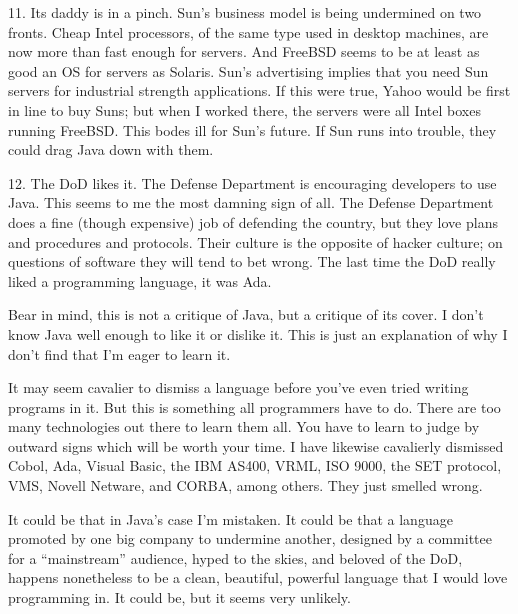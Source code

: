 11. Its daddy is in a pinch. Sun's business model is being undermined on
two fronts. Cheap Intel processors, of the same type used in desktop
machines, are now more than fast enough for servers. And FreeBSD seems
to be at least as good an OS for servers as Solaris. Sun's advertising
implies that you need Sun servers for industrial strength applications.
If this were true, Yahoo would be first in line to buy Suns; but when I
worked there, the servers were all Intel boxes running FreeBSD. This
bodes ill for Sun's future. If Sun runs into trouble, they could drag
Java down with them.

12. The DoD likes it. The Defense Department is encouraging developers
to use Java. This seems to me the most damning sign of all. The Defense
Department does a fine (though expensive) job of defending the country,
but they love plans and procedures and protocols. Their culture is the
opposite of hacker culture; on questions of software they will tend to
bet wrong. The last time the DoD really liked a programming language, it
was Ada.

Bear in mind, this is not a critique of Java, but a critique of its
cover. I don't know Java well enough to like it or dislike it. This is
just an explanation of why I don't find that I'm eager to learn it.

It may seem cavalier to dismiss a language before you've even tried
writing programs in it. But this is something all programmers have to
do. There are too many technologies out there to learn them all. You
have to learn to judge by outward signs which will be worth your time. I
have likewise cavalierly dismissed Cobol, Ada, Visual Basic, the IBM
AS400, VRML, ISO 9000, the SET protocol, VMS, Novell Netware, and CORBA,
among others. They just smelled wrong.

It could be that in Java's case I'm mistaken. It could be that a
language promoted by one big company to undermine another, designed by a
committee for a ``mainstream'' audience, hyped to the skies, and beloved
of the DoD, happens nonetheless to be a clean, beautiful, powerful
language that I would love programming in. It could be, but it seems
very unlikely.

